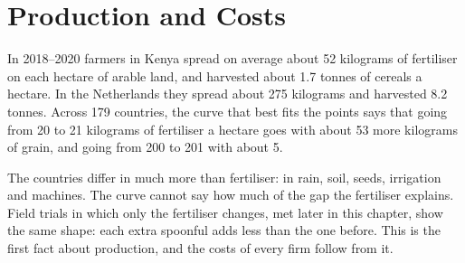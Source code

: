 \chapter{Production and Costs}\label{ch:g11:production-and-costs}

In 2018--2020 farmers in Kenya spread on average about 52 kilograms of fertiliser on each hectare of arable land, and harvested about 1.7 tonnes
of cereals a hectare. In the Netherlands they spread about 275 kilograms and harvested 8.2 tonnes. Across 179 countries, the curve that best fits
the points says that going from 20 to 21 kilograms of fertiliser a hectare goes with about 53 more kilograms of grain, and going from 200 to 201
with about 5.

The countries differ in much more than fertiliser: in rain, soil, seeds, irrigation and machines. The curve cannot say how much of the gap the
fertiliser explains. Field trials in which only the fertiliser changes, met later in this chapter, show the same shape: each extra spoonful adds
less than the one before. This is the first fact about production, and the costs of every firm follow from it.

